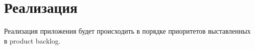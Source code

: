 \section{Реализация}

Реализация приложения будет происходить в порядке приоритетов выставленных в product backlog.









\clearpage